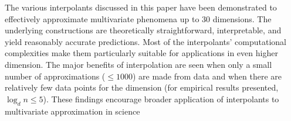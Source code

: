 \documentclass[smallextended,final]{svjour3}  %
\begin{document}
The various interpolants discussed in this paper have been
demonstrated to effectively approximate multivariate phenomena up to
$30$ dimensions. The underlying constructions are theoretically
straightforward, interpretable, and yield reasonably accurate
predictions. Most of the interpolants' computational complexities make
them particularly suitable for applications in even higher
dimension. The major benefits of interpolation are seen when only a
small number of approximations ($\leq 1000$) are made from data and
when there are relatively few data points for the dimension (for
empirical results presented, $\log_d n \leq 5$). These findings
encourage broader application of interpolants to multivariate
approximation in science





\newpage
\end{document}
